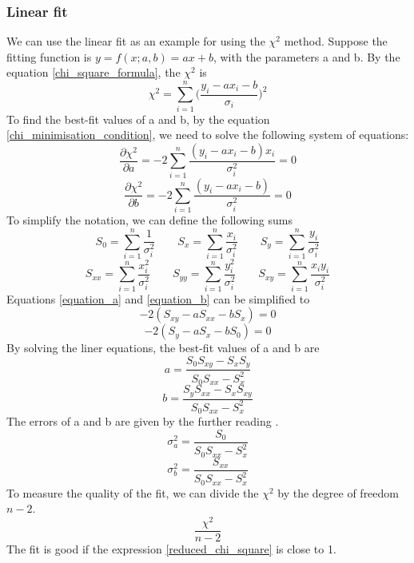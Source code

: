 \documentclass[12pt,a4paper]{report}
\begin{document}
\subsubsection{Linear fit}
We can use the linear fit as an example for using the $\chi^2$ method.
Suppose the fitting function is $y = f(x;a,b) = ax + b$, with the parameters a and b.
By the equation \ref{chi_square_formula}, the $\chi^2$ is
\begin{equation*}
\chi^2 = \sum_{i = 1}^{n} \Big ( \frac{y_i - a x_i - b}{\sigma_i} \Big )^2
\end{equation*}
To find the best-fit values of a and b, by the equation \ref{chi_minimisation_condition}, we need to solve the following system of equations:
\begin{equation} \label{equation_a}
\frac{\partial \chi^2}{\partial a} = -2 \sum_{i = 1}^{n} \frac{ (y_i - a x_i - b) x_i }{\sigma_i^2} = 0
\end{equation}
\begin{equation} \label{equation_b}
\frac{\partial \chi^2}{\partial b} = -2 \sum_{i = 1}^{n} \frac{ (y_i - a x_i - b) }{\sigma_i^2} = 0
\end{equation}
To simplify the notation, we can define the following sums
\begin{equation*}
S_0 = \sum_{i = 1}^{n} \frac{1}{\sigma_i^2} \qquad
S_x = \sum_{i = 1}^{n} \frac{x_i}{\sigma_i^2} \qquad
S_y = \sum_{i = 1}^{n} \frac{y_i}{\sigma_i^2}
\end{equation*}
\begin{equation*}
S_{xx} = \sum_{i = 1}^{n} \frac{x_i^2}{\sigma_i^2} \qquad
S_{yy} = \sum_{i = 1}^{n} \frac{y_i^2}{\sigma_i^2} \qquad
S_{xy} = \sum_{i = 1}^{n} \frac{x_i y_i}{\sigma_i^2}
\end{equation*}
Equations \ref{equation_a} and \ref{equation_b} can be simplified to
\begin{equation*}
-2(S_{xy} - a S_{xx} - b S_x) = 0
\end{equation*}
\begin{equation*}
-2(S_y - a S_x - b S_0) = 0
\end{equation*}
By solving the liner equations, the best-fit values of a and b are
\begin{equation*}
a = \frac{S_0 S_{xy} - S_x S_y}{S_0 S_{xx} - S_x^2}
\end{equation*}
\begin{equation*}
b = \frac{S_y S_{xx} - S_x S_{xy}}{S_0 S_{xx} - S_x^2}
\end{equation*}
The errors of a and b are given by the further reading \cite{stat_2}.
\begin{equation*}
\sigma_a^2 = \frac{S_0}{S_0 S_{xx} - S_x^2}
\end{equation*}
\begin{equation*}
\sigma_b^2 = \frac{S_{xx}}{S_0 S_{xx} - S_x^2}
\end{equation*}
To measure the quality of the fit, we can divide the $\chi^2$ by the degree of freedom $n-2$.
\begin{equation} \label{reduced_chi_square}
\frac{\chi^2}{n-2}
\end{equation}
The fit is good if the expression \ref{reduced_chi_square} is close to 1.
\end{document}
